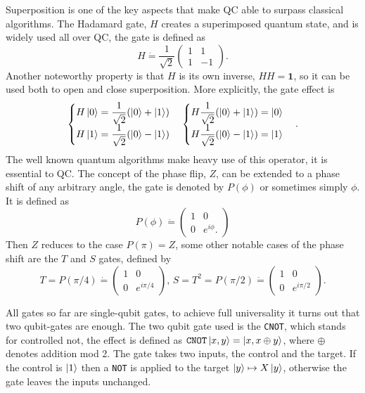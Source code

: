 Superposition is one of the key aspects that make QC able to surpass classical algorithms. The Hadamard gate, $H$ creates a superimposed quantum state, and is widely used all over QC, the gate is defined as
\begin{equation}
H \dot{=} \dfrac{1}{\sqrt{2}}\begin{pmatrix}
1 & 1 \\ 1 & -1
\end{pmatrix}.
\end{equation}
Another noteworthy property is that $H$ is its own inverse, $HH = \mathbf{1}$, so it can be used both to open and close superposition. More explicitly, the gate effect is 
\begin{equation}
\begin{cases}
H\ket{0} = \dfrac{1}{\sqrt{2}}(\ket{0} + \ket{1})
\\
H\ket{1} = \dfrac{1}{\sqrt{2}}(\ket{0} - \ket{1})
\end{cases}
\begin{cases}
H\dfrac{1}{\sqrt{2}}(\ket{0} + \ket{1}) = \ket{0}
\\
H\dfrac{1}{\sqrt{2}}(\ket{0} - \ket{1}) = \ket{1}
\end{cases}.
\end{equation}
The well known quantum algorithms make heavy use of this operator\cite{Grover}\cite{shor}, it is essential to QC.
The concept of the phase flip, $Z$, can be extended to a phase shift of any arbitrary angle, the gate is denoted by $P(\phi)$ or sometimes simply $\phi$. It is defined as 
\begin{equation}
P(\phi) \dot{=} \begin{pmatrix}
1 & 0 \\
0 & e^{i\phi}.
\end{pmatrix}
\end{equation}
Then $Z$ reduces to the case $P(\pi) = Z$, some other notable cases of the phase shift are the $T$ and $S$ gates, defined by
\begin{equation}
T = P({\pi/4}) \dot{=} \begin{pmatrix}
1 & 0 \\ 0 & e^{i\pi/4}
\end{pmatrix},\, S = T^2 = P({\pi/2}) \dot{=} \begin{pmatrix}
1 & 0 \\ 0 & e^{i\pi/2}
\end{pmatrix}.
\end{equation}

All gates so far are single-qubit gates, to achieve full universality it turns out that two qubit-gates are enough. The two qubit gate used is the {\tt CNOT}, which stands for controlled not, the effect is defined as ${\tt CNOT}\ket{x,y} = \ket{x,x\oplus y}$, where $\oplus$ denotes addition mod 2. The gate takes two inputs, the control and the target. If the control is $\ket{1}$ then a {\tt NOT} is applied to the target $\ket{y} \mapsto X\ket{y}$, otherwise the gate leaves the inputs unchanged.



